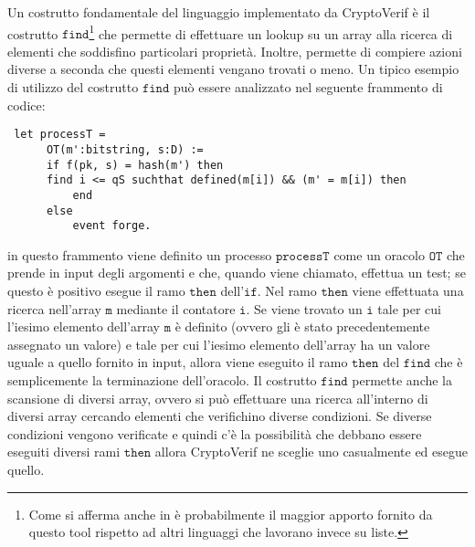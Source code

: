 \documentclass[a4paper,openright,twoside,12pt]{report}
\begin{document}
Un costrutto fondamentale del linguaggio implementato da CryptoVerif \`e il costrutto $\texttt{find}$\footnote{Come si afferma anche in \cite{BlanchetPointchevalCrypto06} \`e probabilmente il maggior apporto 
fornito da questo tool rispetto ad altri linguaggi che lavorano invece su liste.} 
che permette di effettuare un lookup su un array alla ricerca di elementi che soddisfino particolari propriet\`a. Inoltre, permette di compiere azioni diverse a seconda che 
questi elementi vengano trovati o meno. Un tipico esempio di utilizzo del costrutto $\texttt{find}$ pu\`o essere analizzato nel seguente frammento di codice:
\begin{verbatim}
 let processT =
      OT(m':bitstring, s:D) :=
      if f(pk, s) = hash(m') then
      find i <= qS suchthat defined(m[i]) && (m' = m[i]) then 
          end 
      else
          event forge.
\end{verbatim}
in questo frammento viene definito un processo $\texttt{processT}$ come un oracolo $\texttt{OT}$ che prende in input degli argomenti e che, quando viene chiamato, effettua un test; se questo \`e positivo esegue il ramo
$\texttt{then}$ dell'$\texttt{if}$. Nel ramo $\texttt{then}$ viene effettuata una ricerca nell'array $\texttt{m}$ mediante il contatore $\texttt{i}$. Se viene trovato un $\texttt{i}$ tale per cui l'iesimo elemento dell'array $\texttt{m}$ \`e definito (ovvero gli \`e stato
precedentemente assegnato un valore) e tale per cui l'iesimo elemento dell'array ha un valore uguale a quello fornito in input, allora viene eseguito il ramo $\texttt{then}$ del $\texttt{find}$ che \`e semplicemente
la terminazione dell'oracolo.
Il costrutto $\texttt{find}$ permette anche la scansione di diversi array, ovvero si pu\`o effettuare una ricerca all'interno di diversi array cercando elementi che verifichino diverse condizioni.
Se diverse condizioni vengono verificate e quindi c'\`e la possibilit\`a che debbano essere eseguiti diversi rami $\texttt{then}$ allora CryptoVerif 
ne sceglie uno casualmente ed esegue quello.
\end{document}
